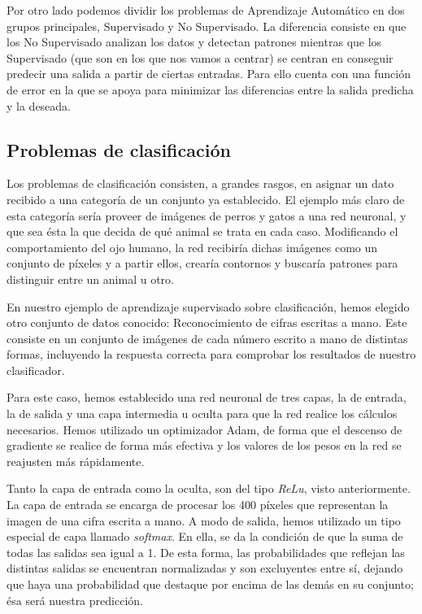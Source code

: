 Por otro lado podemos dividir los problemas de Aprendizaje Automático en dos grupos principales, Supervisado y No Supervisado. La diferencia consiste en que los No Supervisado analizan los datos y detectan patrones mientras que los Supervisado (que son en los que nos vamos a centrar) se centran en conseguir predecir una salida a partir de ciertas entradas. Para ello cuenta con una función de error en la que se apoya para minimizar las diferencias entre la salida predicha y la deseada.

\subsection{Problemas de clasificación}
Los problemas de clasificación consisten, a grandes rasgos, en asignar un dato recibido a una categoría de un conjunto ya establecido. El ejemplo más claro de esta categoría sería proveer de imágenes de perros y gatos a una red neuronal, y que sea ésta la que decida de qué animal se trata en cada caso. Modificando el comportamiento del ojo humano, la red recibiría dichas imágenes como un conjunto de píxeles y a partir ellos, crearía contornos y buscaría patrones para distinguir entre un animal u otro.

En nuestro ejemplo de aprendizaje supervisado sobre clasificación, hemos elegido otro conjunto de datos conocido: Reconocimiento de cifras escritas a mano. Este consiste en un conjunto de imágenes de cada número escrito a mano de distintas formas, incluyendo la respuesta correcta para comprobar los resultados de nuestro clasificador.

Para este caso, hemos establecido una red neuronal de tres capas, la de entrada, la de salida y una capa intermedia u oculta para que la red realice los cálculos necesarios. Hemos utilizado un optimizador Adam, de forma que el descenso de gradiente se realice de forma más efectiva y los valores de los pesos en la red se reajusten más rápidamente.

Tanto la capa de entrada como la oculta, son del tipo \textit{ReLu}, visto anteriormente. La capa de entrada se encarga de procesar los 400 píxeles que representan la imagen de una cifra escrita a mano. A modo de salida, hemos utilizado un tipo especial de capa llamado \textit{softmax}. En ella, se da la condición de que la suma de todas las salidas sea igual a 1. De esta forma, las probabilidades que reflejan las distintas salidas se encuentran normalizadas y son excluyentes entre sí, dejando que haya una probabilidad que destaque por encima de las demás en su conjunto; ésa será nuestra predicción. 

